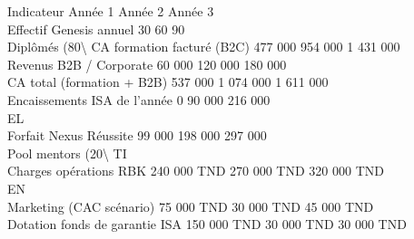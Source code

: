 \vspace{0.5em}
Indicateur                                 Année 1          Année 2          Année 3\\
Effectif Genesis annuel                          30              60               90\\
Diplômés (80\textbackslash{}%
CA formation facturé (B2C)                  477 000          954 000        1 431 000\\
Revenus B2B / Corporate                      60 000          120 000          180 000\\
CA total (formation + B2B)                  537 000        1 074 000        1 611 000\\
Encaissements ISA de l’année                         0        90 000          216 000\\
\vspace{0.5em}
\vspace{0.5em}
\vspace{0.5em}
\vspace{0.5em}
EL\\
Forfait Nexus Réussite                       99 000          198 000          297 000\\
Pool mentors (20\textbackslash{}%
\vspace{0.5em}
\vspace{0.5em}
\vspace{0.5em}
\vspace{0.5em}
TI\\
Charges opérations RBK                 240 000 TND       270 000 TND   320 000 TND\\
\vspace{0.5em}
\vspace{0.5em}
\vspace{0.5em}
\vspace{0.5em}
EN\\
Marketing (CAC scénario)                75 000 TND        30 000 TND       45 000 TND\\
Dotation fonds de garantie ISA         150 000 TND        30 000 TND       30 000 TND\\
\vspace{0.5em}
\vspace{0.5em}
\vspace{0.5em}
\vspace{0.5em}

